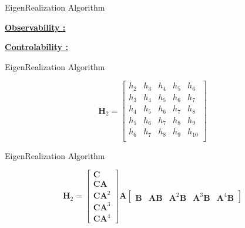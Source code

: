\documentclass[aspectratio=169, usenames, dvipsnames]{beamer}
\begin{document}
\begin{frame}{EigenRealization Algorithm}
  \vfill

  \centering

  \underline{\textbf{Observability :}} 

  \vfill

  \underline{\textbf{Controlability :}} 

  \vfill
\end{frame}

\begin{frame}{EigenRealization Algorithm}
  \vfill

  \Large
  \[
  \bm{H}_2
  =
  \begin{bmatrix}
    h_2 & h_3 & h_4 & h_5 & h_6 \\
    h_3 & h_4 & h_5 & h_6 & h_7 \\
    h_4 & h_5 & h_6 & h_7 & h_8 \\
    h_5 & h_6 & h_7 & h_8 & h_9 \\
    h_6 & h_7 & h_8 & h_9 & h_{10} \\
  \end{bmatrix}
  \]

  \vfill
\end{frame}


\begin{frame}{EigenRealization Algorithm}
  \vfill

  \Large
  \[
  \bm{H}_2
  =
  \begin{bmatrix}
    \bm{C} \\ \bm{CA} \\ \bm{CA}^2 \\ \bm{CA}^3 \\ \bm{CA}^4
  \end{bmatrix}
  \bm{A}
  \begin{bmatrix}
    \bm{B} & \bm{AB} & \bm{A}^2 \bm{B} & \bm{A}^3 \bm{B} & \bm{A}^4 \bm{B}
  \end{bmatrix}
  \]

  \vfill
\end{frame}
\end{document}
